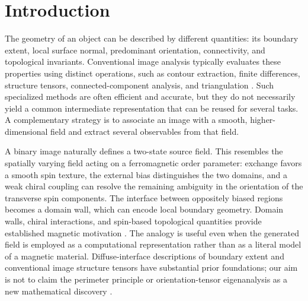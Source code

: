 \documentclass[11pt,a4paper]{article}
\begin{document}
\section*{Introduction}
The geometry of an object can be described by different quantities: its boundary extent, local surface normal, predominant orientation, connectivity, and topological invariants. Conventional image analysis typically evaluates these properties using distinct operations, such as contour extraction, finite differences, structure tensors, connected-component analysis, and triangulation \cite{Bigun1991,Haralick1979}. Such specialized methods are often efficient and accurate, but they do not necessarily yield a common intermediate representation that can be reused for several tasks. A complementary strategy is to associate an image with a smooth, higher-dimensional field and extract several observables from that field.

A binary image naturally defines a two-state source field. This resembles the spatially varying field acting on a ferromagnetic order parameter: exchange favors a smooth spin texture, the external bias distinguishes the two domains, and a weak chiral coupling can resolve the remaining ambiguity in the orientation of the transverse spin components. The interface between oppositely biased regions becomes a domain wall, which can encode local boundary geometry. Domain walls, chiral interactions, and spin-based topological quantities provide established magnetic motivation \cite{Dzyaloshinskii1958,Moriya1960,Nagaosa2013}. The analogy is useful even when the generated field is employed as a computational representation rather than as a literal model of a magnetic material. Diffuse-interface descriptions of boundary extent and conventional image structure tensors have substantial prior foundations; our aim is not to claim the perimeter principle or orientation-tensor eigenanalysis as a new mathematical discovery \cite{Modica1987,Bigun1991}.
\end{document}
